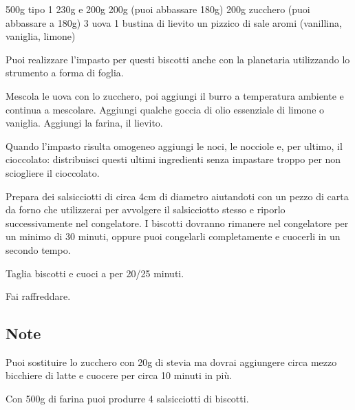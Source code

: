 \begin{ingreds}
	500g  tipo 1
	230g  e 
	200g 
	200g  (puoi abbassare 180g)
	200g zucchero (puoi abbassare a 180g)
	3 uova
	1 bustina di lievito
	un pizzico di sale
	aromi (vanillina, vaniglia, limone)

\end{ingreds}

\begin{method}
Puoi realizzare l'impasto per questi biscotti anche con la planetaria utilizzando lo strumento a forma di foglia.

Mescola le uova con lo zucchero, poi aggiungi il burro a temperatura ambiente e continua a mescolare. Aggiungi qualche goccia di olio essenziale di limone o vaniglia. Aggiungi la farina, il lievito.

Quando l'impasto risulta omogeneo aggiungi le noci, le nocciole e, per ultimo, il cioccolato: distribuisci questi ultimi ingredienti senza impastare troppo per non sciogliere il cioccolato.
	
Prepara dei salsicciotti di circa 4cm di diametro aiutandoti con un pezzo di carta da forno che utilizzerai per avvolgere il salsicciotto stesso e riporlo successivamente nel congelatore. I biscotti dovranno rimanere nel congelatore per un minimo di 30 minuti, oppure puoi congelarli completamente e cuocerli in un secondo tempo.
	
Taglia biscotti e cuoci a  per 20/25 minuti.

Fai raffreddare.

\end{method}

\subsection*{Note}
		Puoi sostituire lo zucchero con 20g di stevia ma dovrai aggiungere circa mezzo bicchiere di latte e cuocere per circa 10 minuti in più.
		
		Con 500g di farina puoi produrre 4 salsicciotti di biscotti.
